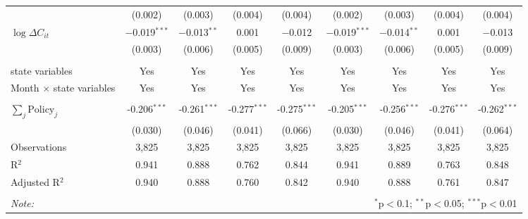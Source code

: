 \begin{tabular}{@{\extracolsep{1pt}}lcccccccc}
  & (0.002) & (0.003) & (0.004) & (0.004) & (0.002) & (0.003) & (0.004) & (0.004) \\ 
  $\log \Delta C_{it}$ & $-$0.019$^{***}$ & $-$0.013$^{**}$ & 0.001 & $-$0.012 & $-$0.019$^{***}$ & $-$0.014$^{**}$ & 0.001 & $-$0.013 \\ 
  & (0.003) & (0.006) & (0.005) & (0.009) & (0.003) & (0.006) & (0.005) & (0.009) \\ 
 \hline \\[-1.8ex] 
state variables & Yes & Yes & Yes & Yes & Yes & Yes & Yes & Yes \\ 
Month $\times$ state variables & Yes & Yes & Yes & Yes & Yes & Yes & Yes & Yes \\ 
\hline \\[-1.8ex] 
$\sum_j \mathrm{Policy}_j$ & -0.206$^{***}$ & -0.261$^{***}$ & -0.277$^{***}$ & -0.275$^{***}$ & -0.205$^{***}$ & -0.256$^{***}$ & -0.276$^{***}$ & -0.262$^{***}$ \\ 
 & (0.030) & (0.046) & (0.041) & (0.066) & (0.030) & (0.046) & (0.041) & (0.064) \\ 
Observations & 3,825 & 3,825 & 3,825 & 3,825 & 3,825 & 3,825 & 3,825 & 3,825 \\ 
R$^{2}$ & 0.941 & 0.888 & 0.762 & 0.844 & 0.941 & 0.889 & 0.763 & 0.848 \\ 
Adjusted R$^{2}$ & 0.940 & 0.888 & 0.760 & 0.842 & 0.940 & 0.888 & 0.761 & 0.847 \\ 
\hline 
\hline \\[-1.8ex] 
\textit{Note:}  & \multicolumn{8}{r}{$^{*}$p$<$0.1; $^{**}$p$<$0.05; $^{***}$p$<$0.01} \\ 
\end{tabular} 